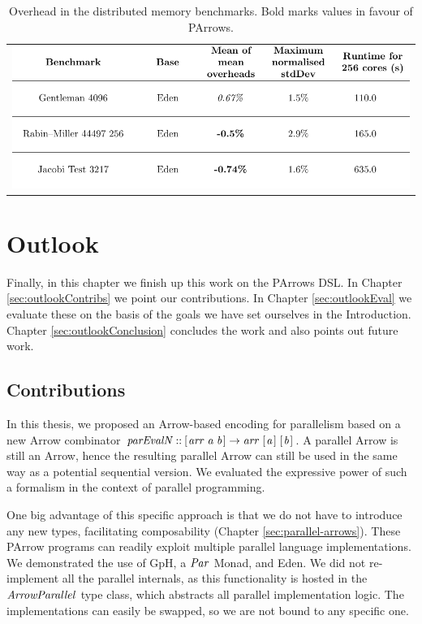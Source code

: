 \documentclass[paper=A4,twoside=true,openright,parskip=full,chapterprefix=true,headings=normal,bibliography=totoc,listof=totoc,titlepage=on,captions=tableabove,draft=false,british]{scrreprt}%
\begin{document}
\begin{longtable}[]{@{}l@{}}
\caption{Overhead in the distributed memory benchmarks. Bold marks
values in favour of PArrows.
\label{tbl:meanOverHeadDistributedMemory}}\tabularnewline
\includegraphics{src/img/bestAndWorstBenchmarks2.pdf}\tabularnewline
\end{longtable}

\hypertarget{outlook}{%
\chapter{Outlook}\label{outlook}}

\label{sec:outlook}

Finally, in this chapter we finish up this work on the PArrows DSL. In
Chapter \ref{sec:outlookContribs} we point our contributions. In Chapter
\ref{sec:outlookEval} we evaluate these on the basis of the goals we
have set ourselves in the Introduction. Chapter
\ref{sec:outlookConclusion} concludes the work and also points out
future work.

\hypertarget{contributions}{%
\section{Contributions}\label{contributions}}

\label{sec:outlookContribs}

In this thesis, we proposed an Arrow-based encoding for parallelism
based on a new Arrow combinator \ensuremath{\Varid{parEvalN}\mathbin{::}[\mskip1.5mu \Varid{arr}\;\Varid{a}\;\Varid{b}\mskip1.5mu]\to \Varid{arr}\;[\mskip1.5mu \Varid{a}\mskip1.5mu]\;[\mskip1.5mu \Varid{b}\mskip1.5mu]}.
A parallel Arrow is still an Arrow, hence the resulting parallel Arrow
can still be used in the same way as a potential sequential version. We
evaluated the expressive power of such a formalism in the context of
parallel programming.

One big advantage of this specific approach is that we do not have to
introduce any new types, facilitating composability (Chapter
\ref{sec:parallel-arrows}). These PArrow programs can readily exploit
multiple parallel language implementations. We demonstrated the use of
GpH, a \ensuremath{\Conid{Par}} Monad, and Eden. We did not re-implement all the parallel
internals, as this functionality is hosted in the \ensuremath{\Conid{ArrowParallel}} type
class, which abstracts all parallel implementation logic. The
implementations can easily be swapped, so we are not bound to any
specific one.
\end{document}
